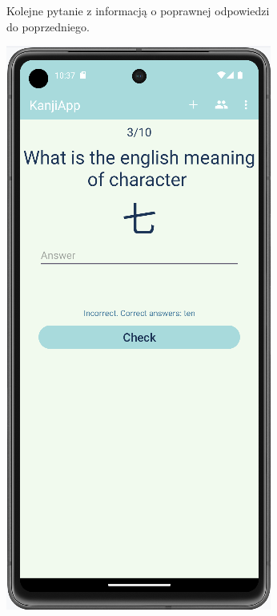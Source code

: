 \documentclass[a4paper,twoside,12pt]{book}
\begin{document}
\begin{figure}
\begin{subfigure}{0.3\textwidth}
   \caption{Kolejne pytanie z informacją o poprawnej odpowiedzi do poprzedniego.}
   \label{fig:correct}
\end{subfigure}
\hfill 
\begin{subfigure}{0.3\textwidth}
   \includegraphics[width=\textwidth]{learn/incorrect}

\end{subfigure}
\end{figure}
\end{document}
